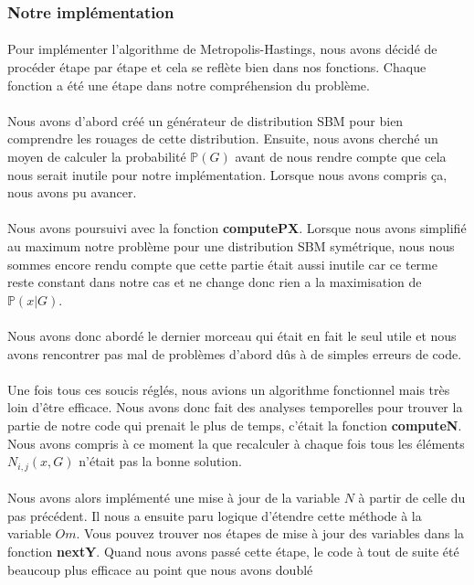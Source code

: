 \subsubsection*{Notre implémentation}
\paragraph*{}
Pour implémenter l'algorithme de Metropolis-Hastings, nous avons décidé de 
procéder étape par étape et cela se reflète bien dans nos fonctions. Chaque 
fonction a été une étape dans notre compréhension du problème. 
\\\\
Nous avons d'abord créé un générateur de distribution SBM pour bien comprendre les 
rouages de cette distribution. Ensuite, nous avons cherché un moyen de calculer
la probabilité $\mathbb{P}(G)$ avant de nous rendre compte que cela nous serait inutile 
pour notre implémentation. Lorsque nous avons compris ça, nous avons pu avancer.
\\\\
Nous avons poursuivi avec la fonction \textbf{computePX}. Lorsque nous avons simplifié au maximum 
notre problème pour une distribution SBM symétrique, nous nous sommes encore rendu compte
que cette partie était aussi inutile car ce terme reste constant dans notre cas et ne change 
donc rien a la maximisation de $\mathbb{P}(x|G)$. 
\\\\
Nous avons donc abordé le dernier morceau qui était en fait le seul utile et 
nous avons rencontrer pas mal de problèmes d'abord dûs à de simples erreurs de code. 
\\\\
Une fois tous ces soucis réglés, nous avions un algorithme fonctionnel mais 
très loin d'être efficace. Nous avons donc fait des analyses temporelles pour trouver la partie 
de notre code qui prenait le plus de temps, c'était la fonction \textbf{computeN}. Nous avons compris
à ce moment la que recalculer à chaque fois tous les éléments $N_{i,j}(x,G)$ n'était pas la bonne 
solution. 
\\\\
Nous avons alors implémenté une mise à jour de la variable $N$ à partir de celle du pas
précédent. Il nous a ensuite paru logique d'étendre cette méthode à la variable $Om$. Vous pouvez 
trouver nos étapes de mise à jour des variables dans la fonction \textbf{nextY}. Quand nous avons
passé cette étape, le code à tout de suite été beaucoup plus efficace au point que nous avons doublé
